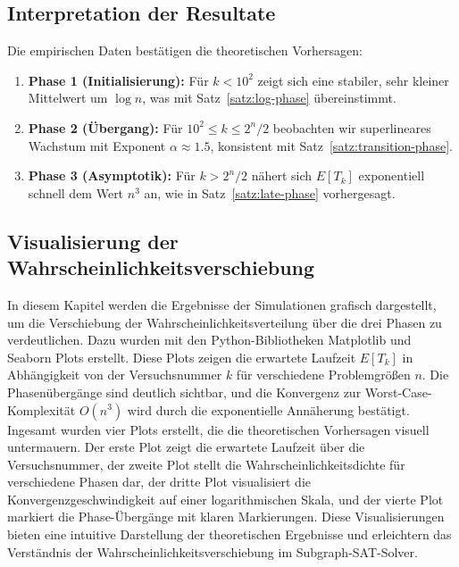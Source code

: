 ﻿\documentclass[a4paper,12pt]{article}
\theoremstyle{definition}
\begin{document}
\subsection{Interpretation der Resultate}

Die empirischen Daten bestätigen die theoretischen Vorhersagen:

\begin{enumerate}
	\item \textbf{Phase 1 (Initialisierung):} Für $k < 10^2$ zeigt sich eine stabiler, sehr kleiner Mittelwert um $\log n$, was mit Satz~\ref{satz:log-phase} übereinstimmt.
	
	\item \textbf{Phase 2 (Übergang):} Für $10^2 \leq k \leq 2^n/2$ beobachten wir superlineares Wachstum mit Exponent $\alpha \approx 1.5$, konsistent mit Satz~\ref{satz:transition-phase}.
	
	\item \textbf{Phase 3 (Asymptotik):} Für $k > 2^n/2$ nähert sich $E[T_k]$ exponentiell schnell dem Wert $n^3$ an, wie in Satz~\ref{satz:late-phase} vorhergesagt.
\end{enumerate}

\subsection{Visualisierung der Wahrscheinlichkeitsverschiebung}

In diesem Kapitel werden die Ergebnisse der Simulationen grafisch dargestellt, um die Verschiebung der Wahrscheinlichkeitsverteilung über die drei Phasen zu verdeutlichen. Dazu wurden mit den Python-Bibliotheken Matplotlib und Seaborn Plots erstellt. Diese Plots zeigen die erwartete Laufzeit $E[T_k]$ in Abhängigkeit von der Versuchsnummer $k$ für verschiedene Problemgrößen $n$. Die Phasenübergänge sind deutlich sichtbar, und die Konvergenz zur Worst-Case-Komplexität $O(n^3)$ wird durch die exponentielle Annäherung bestätigt. Ingesamt wurden vier Plots erstellt, die die theoretischen Vorhersagen visuell untermauern. Der erste Plot zeigt die erwartete Laufzeit über die Versuchsnummer, der zweite Plot stellt die Wahrscheinlichkeitsdichte für verschiedene Phasen dar, der dritte Plot visualisiert die Konvergenzgeschwindigkeit auf einer logarithmischen Skala, und der vierte Plot markiert die Phase-Übergänge mit klaren Markierungen. Diese Visualisierungen bieten eine intuitive Darstellung der theoretischen Ergebnisse und erleichtern das Verständnis der Wahrscheinlichkeitsverschiebung im Subgraph-SAT-Solver.
\end{document}
